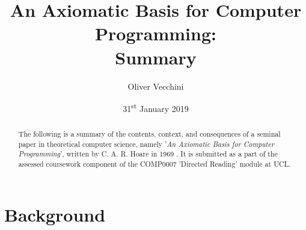 \documentclass[11pt]{article}
\begin{document}
\setlength{\abovedisplayskip}{4pt}
\setlength{\belowdisplayskip}{7pt}
\setlength{\abovedisplayshortskip}{4pt}
\setlength{\belowdisplayshortskip}{7pt}

\title{An Axiomatic Basis for Computer Programming: \\Summary} 
\author{Oliver Vecchini} 
\date{31\textsuperscript{st} January 2019}

\maketitle


\begin{abstract}

        The following is a summary of the contents, context, and consequences of
        a seminal paper in theoretical computer science, namely '\textit{An
        Axiomatic Basis for Computer Programming}', written by C. A. R. Hoare in
        1969 \cite{hoare1969axiomatic}. It is submitted as a part of the
        assessed coursework component of the COMP0007 'Directed Reading' module
        at UCL.

\end{abstract}


\section{Background}
\end{document}
